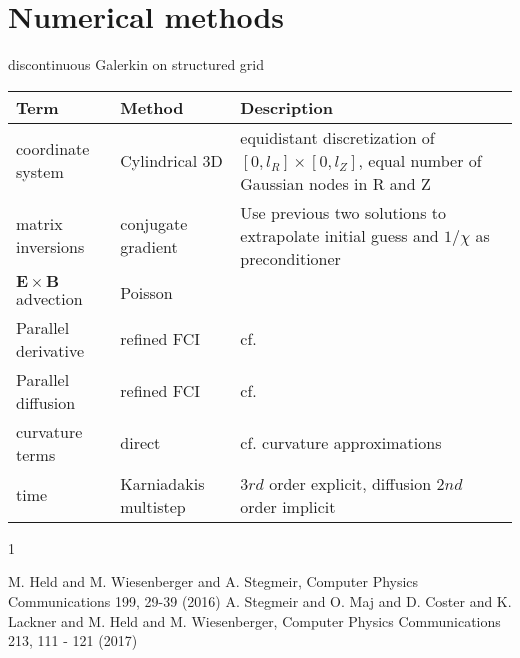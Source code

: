 \documentclass{hitec} %
\renewenvironment{thebibliography}[1]{
  \begin{oldthebibliography}{#1}
    \RaggedRight %
    \setlength{\itemsep}{0em}
    \setlength{\parskip}{0em}
}
{
  \end{oldthebibliography}
}
\newcommand{\ExB}{$\bm{E}\times\bm{B} \,$}
\begin{document}
\section{Numerical methods}
discontinuous Galerkin on structured grid 
\begin{longtable}{ll>{\RaggedRight}p{7cm}}
\toprule
\rowcolor{gray!50}\textbf{Term} &  \textbf{Method} & \textbf{Description}  \\ \midrule
coordinate system & Cylindrical 3D & equidistant discretization of $[0,l_R] \times [0,l_Z]$, equal number of Gaussian nodes in R and Z \\
matrix inversions & conjugate gradient & Use previous two solutions to extrapolate initial guess and $1/\chi$ as preconditioner \\
\ExB advection & Poisson & \\
Parallel derivative & refined  FCI & cf.~\cite{held16,stegmeir17} \\
Parallel diffusion & refined FCI & cf.~\cite{held16,stegmeir17} \\
curvature terms & direct & cf. curvature approximations \\
time &  Karniadakis multistep & $3rd$ order explicit, diffusion $2nd$ order implicit \\
\bottomrule
\end{longtable}
\begin{thebibliography}{1}
  M. Held and M. Wiesenberger and A. Stegmeir,  Computer Physics Communications 199, 29-39 (2016)
  A. Stegmeir and O. Maj and D. Coster and K. Lackner and M. Held and M. Wiesenberger, Computer Physics Communications 213, 111 - 121 (2017)
\end{thebibliography}
\end{document}
